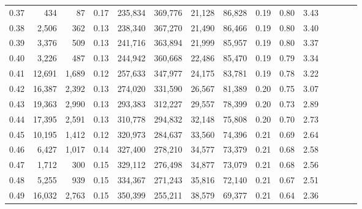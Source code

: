 \begin{tabular}{rrrcrrrrrrrrrrr}
0.37 &     434 &     87 &                                       0.17 &  235,834 &  369,776 &   21,128 &   86,828 &  0.19 &  0.80 &                         3.43 \\
0.38 &   2,506 &    362 &                                       0.13 &  238,340 &  367,270 &   21,490 &   86,466 &  0.19 &  0.80 &                         3.40 \\
0.39 &   3,376 &    509 &                                       0.13 &  241,716 &  363,894 &   21,999 &   85,957 &  0.19 &  0.80 &                         3.37 \\
0.40 &   3,226 &    487 &                                       0.13 &  244,942 &  360,668 &   22,486 &   85,470 &  0.19 &  0.79 &                         3.34 \\
0.41 &  12,691 &  1,689 &                                       0.12 &  257,633 &  347,977 &   24,175 &   83,781 &  0.19 &  0.78 &                         3.22 \\
0.42 &  16,387 &  2,392 &                                       0.13 &  274,020 &  331,590 &   26,567 &   81,389 &  0.20 &  0.75 &                         3.07 \\
0.43 &  19,363 &  2,990 &                                       0.13 &  293,383 &  312,227 &   29,557 &   78,399 &  0.20 &  0.73 &                         2.89 \\
0.44 &  17,395 &  2,591 &                                       0.13 &  310,778 &  294,832 &   32,148 &   75,808 &  0.20 &  0.70 &                         2.73 \\
0.45 &  10,195 &  1,412 &                                       0.12 &  320,973 &  284,637 &   33,560 &   74,396 &  0.21 &  0.69 &                         2.64 \\
0.46 &   6,427 &  1,017 &                                       0.14 &  327,400 &  278,210 &   34,577 &   73,379 &  0.21 &  0.68 &                         2.58 \\
0.47 &   1,712 &    300 &                                       0.15 &  329,112 &  276,498 &   34,877 &   73,079 &  0.21 &  0.68 &                         2.56 \\
0.48 &   5,255 &    939 &                                       0.15 &  334,367 &  271,243 &   35,816 &   72,140 &  0.21 &  0.67 &                         2.51 \\
0.49 &  16,032 &  2,763 &                                       0.15 &  350,399 &  255,211 &   38,579 &   69,377 &  0.21 &  0.64 &                         2.36 \\

\end{tabular}

